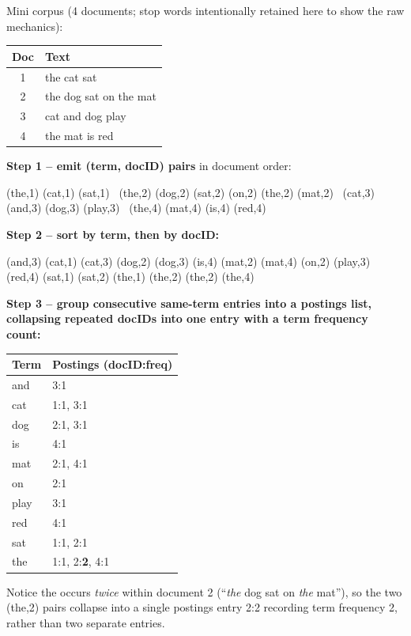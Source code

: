 \documentclass[11pt, a4paper]{article}
\begin{document}
\begin{examplebox}
Mini corpus (4 documents; stop words intentionally retained here to show the raw mechanics):
\begin{center}
\begin{tabular}{@{}cl@{}}
\toprule
Doc & Text \\
\midrule
1 & the cat sat \\
2 & the dog sat on the mat \\
3 & cat and dog play \\
4 & the mat is red \\
\bottomrule
\end{tabular}
\end{center}

\textbf{Step 1 -- emit (term, docID) pairs} in document order:
\begin{center}
\small
(the,1) (cat,1) (sat,1) \ (the,2) (dog,2) (sat,2) (on,2) (the,2) (mat,2) \ (cat,3) (and,3) (dog,3) (play,3) \ (the,4) (mat,4) (is,4) (red,4)
\end{center}

\textbf{Step 2 -- sort by term, then by docID:}
\begin{center}
\small
(and,3) (cat,1) (cat,3) (dog,2) (dog,3) (is,4) (mat,2) (mat,4) (on,2) (play,3) (red,4) (sat,1) (sat,2) (the,1) (the,2) (the,2) (the,4)
\end{center}

\textbf{Step 3 -- group consecutive same-term entries into a postings list, collapsing repeated docIDs into one entry with a term frequency count:}
\begin{center}
\begin{tabular}{@{}ll@{}}
\toprule
Term & Postings (docID:freq) \\
\midrule
and & 3:1 \\
cat & 1:1, 3:1 \\
dog & 2:1, 3:1 \\
is & 4:1 \\
mat & 2:1, 4:1 \\
on & 2:1 \\
play & 3:1 \\
red & 4:1 \\
sat & 1:1, 2:1 \\
the & 1:1, 2:\textbf{2}, 4:1 \\
\bottomrule
\end{tabular}
\end{center}
Notice \textsf{the} occurs \emph{twice} within document 2 (``\textit{the} dog sat on \textit{the} mat''), so the two (the,2) pairs collapse into a single postings entry \textsf{2:2} recording term frequency 2, rather than two separate entries.
\end{examplebox}
\end{document}
